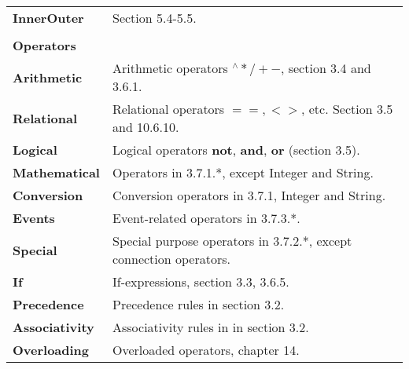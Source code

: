 \documentclass{article}
\begin{document}
\begin{tabular}{l l}
    \indent\textbf{InnerOuter}       & Section 5.4-5.5. \\
  \\
  \textbf{Operators} \\
    \indent\textbf{Arithmetic}       & Arithmetic operators $^\wedge\ast/+-$, section 3.4 and 3.6.1. \\
    \indent\textbf{Relational}       & Relational operators $==, <>$, etc. Section 3.5 and 10.6.10. \\
    \indent\textbf{Logical}          & Logical operators \textbf{not}, \textbf{and}, \textbf{or} (section 3.5). \\
    \indent\textbf{Mathematical}     & Operators in 3.7.1.*, except Integer and String. \\
    \indent\textbf{Conversion}       & Conversion operators in 3.7.1, Integer and String.  \\
    \indent\textbf{Events}           & Event-related operators in 3.7.3.*. \\
    \indent\textbf{Special}          & Special purpose operators in 3.7.2.*, except connection operators. \\
    \indent\textbf{If}               & If-expressions, section 3.3, 3.6.5. \\
    \indent\textbf{Precedence}       & Precedence rules in section 3.2. \\
    \indent\textbf{Associativity}    & Associativity rules in in section 3.2. \\
    \indent\textbf{Overloading}      & Overloaded operators, chapter 14. \\

\end{tabular}
\end{document}
